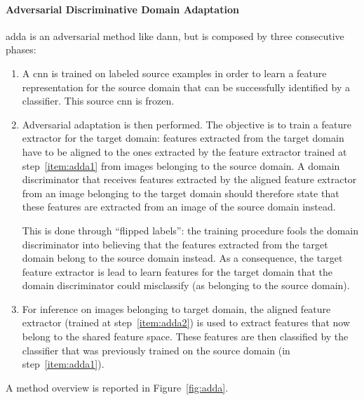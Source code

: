 \documentclass[%
    corpo=12pt,
    twoside,
    stile=classica,   
    tipotesi=magistrale,
    evenboxes,
    english,
	numerazioneromana,
]{toptesi}
\newcommand{\quotes}[1]{``#1''}
\begin{document}
\paragraph{Adversarial Discriminative Domain Adaptation}\label{sec:adda}
\gls{adda}\cite{tzeng2017adversarial} is an adversarial method like \gls{dann}, but is composed by three consecutive phases:
\begin{enumerate}
	\item \label{item:adda1} A \gls{cnn} is trained on labeled source examples in order to learn a feature representation for the source domain that can be successfully identified by a classifier. This source \gls{cnn} is frozen.
	
	\item \label{item:adda2} Adversarial adaptation is then performed.
	The objective is to train a feature extractor for the target domain: features extracted from the target domain have to be aligned to the ones extracted by the feature extractor trained at step~\ref{item:adda1} from images belonging to the source domain. A domain discriminator that receives features extracted by the aligned feature extractor from an image belonging to the target domain should therefore state that these features are extracted from an image of the source domain instead.
	
	This is done through \quotes{flipped labels}: the training procedure fools the domain discriminator into believing that the features extracted from the target domain belong to the source domain instead. As a consequence, the target feature extractor is lead to learn features for the target domain that the domain discriminator could misclassify (as belonging to the source domain).
	
	\item For inference on images belonging to target domain, the aligned feature extractor (trained at step~\ref{item:adda2}) is used to extract features that now belong to the shared feature space. These features are then classified by the classifier that was previously trained on the source domain (in step~\ref{item:adda1}).
\end{enumerate}
A method overview is reported in Figure~\ref{fig:adda}.
\end{document}
